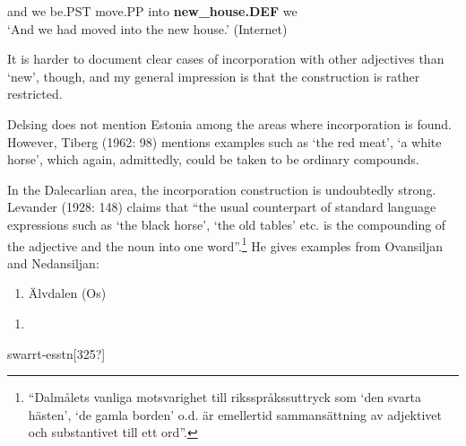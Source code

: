and  we  be.PST  move.PP  into  \textbf{new\_house.DEF} we  \\ %


‘And we had moved into the new house.’ (Internet)
\z


It is harder to document clear cases of incorporation with other adjectives than  ‘new’, though, and my general impression is that the construction is rather restricted.

Delsing does not mention Estonia among the areas where incorporation is found. However, Tiberg (1962: 98) mentions examples such as  ‘the red meat’,  ‘a white horse’, which again, admittedly, could be taken to be ordinary compounds.

In the Dalecarlian area, the incorporation construction is undoubtedly strong. Levander (1928: 148) claims that “the usual counterpart of standard language expressions such as ‘the black horse’, ‘the old tables’ etc. is the compounding of the adjective and the noun into one word”.\footnote{ “Dalmålets vanliga motsvarighet till riksspråkssuttryck som ‘den svarta hästen’, ‘de gamla borden’ o.d. är emellertid sammansättning av adjektivet och substantivet till ett ord”.} He gives examples from Ovansiljan and Nedansiljan: 

\begin{enumerate} %
\item 
Älvdalen (Os)

\end{enumerate} %
\setcounter{listLFOxcviiileveli}{0}
\begin{enumerate} %
\item 
\end{enumerate} %
swarrt-esstn[325?]


